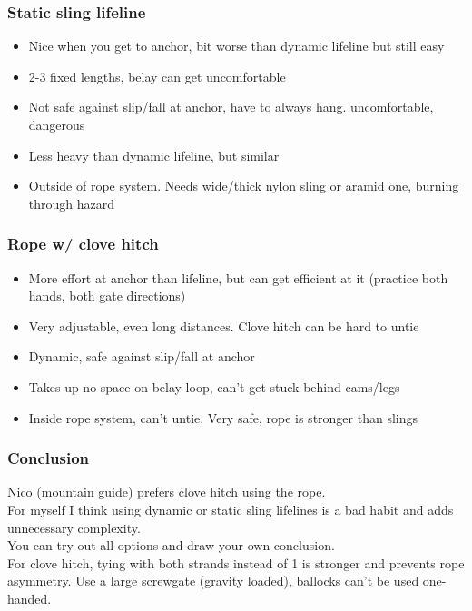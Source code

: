 \subsubsection{Static sling lifeline}
\begin{itemize}
\item Nice when you get to anchor, bit worse than dynamic lifeline but still easy
\item 2-3 fixed lengths, belay can get uncomfortable
\item Not safe against slip/fall at anchor, have to always hang. uncomfortable, dangerous
\item Less heavy than dynamic lifeline, but similar 
\item Outside of rope system. Needs wide/thick nylon sling or aramid one, burning through hazard
\end{itemize} 

\subsubsection{Rope w/ clove hitch}
\begin{itemize}
\item More effort at anchor than lifeline, but can get efficient at it (practice both hands, both gate directions)
\item Very adjustable, even long distances. Clove hitch can be hard to untie
\item Dynamic, safe against slip/fall at anchor
\item Takes up no space on belay loop, can't get stuck behind cams/legs
\item Inside rope system, can't untie. Very safe, rope is stronger than slings
\end{itemize}

\subsubsection{Conclusion}
Nico (mountain guide) prefers clove hitch using the rope.\\
For myself I think using dynamic or static sling lifelines is a bad habit and adds unnecessary complexity.\\
You can try out all options and draw your own conclusion. \\
For clove hitch, tying with both strands instead of 1 is stronger and prevents rope asymmetry. Use a large screwgate (gravity loaded), ballocks can't be used one-handed.


